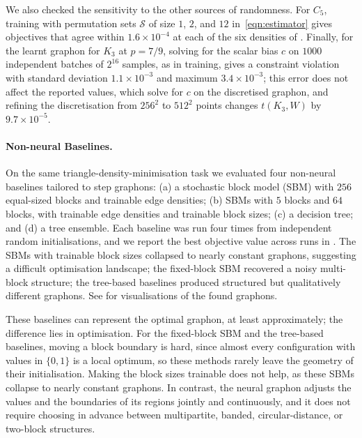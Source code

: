 \documentclass{article}
\theoremstyle{plain}
\theoremstyle{definition}
\theoremstyle{remark}
\begin{document}
We also checked the sensitivity to the other sources of randomness. For $C_5$, training with permutation sets $\mathcal{S}$ of size $1$, $2$, and $12$ in~\eqref{eqn:estimator} gives objectives that agree within $1.6 \times 10^{-4}$ at each of the six densities of . Finally, for the learnt graphon for $K_3$ at $p = 7/9$, solving for the scalar bias $c$ on $1000$ independent batches of $2^{16}$ samples, as in training, gives a constraint violation with standard deviation $1.1 \times 10^{-3}$ and maximum $3.4 \times 10^{-3}$; this error does not affect the reported values, which solve for $c$ on the discretised graphon, and refining the discretisation from $256^2$ to $512^2$ points changes $t(K_3, W)$ by $9.7 \times 10^{-5}$.

\paragraph{Non-neural Baselines.}
On the same triangle-density-minimisation task we evaluated four non-neural baselines tailored to step graphons: (a) a stochastic block model (SBM) with $256$ equal-sized blocks and trainable edge densities; (b) SBMs with $5$ blocks and $64$ blocks, with trainable edge densities and trainable block sizes; (c) a decision tree; and (d) a tree ensemble. 
Each baseline was run four times from independent random initialisations, and we report the best objective value across runs in .
The SBMs with trainable block sizes collapsed to nearly constant graphons, suggesting a difficult optimisation landscape; the fixed-block SBM recovered a noisy multi-block structure; the tree-based baselines produced structured but qualitatively different graphons. See  for visualisations of the found graphons.

These baselines can represent the optimal graphon, at least approximately; the difference lies in optimisation. For the fixed-block SBM and the tree-based baselines, moving a block boundary is hard, since almost every configuration with values in $\{0, 1\}$ is a local optimum, so these methods rarely leave the geometry of their initialisation. Making the block sizes trainable does not help, as these SBMs collapse to nearly constant graphons. In contrast, the neural graphon adjusts the values and the boundaries of its regions jointly and continuously, and it does not require choosing in advance between multipartite, banded, circular-distance, or two-block structures.
\end{document}
